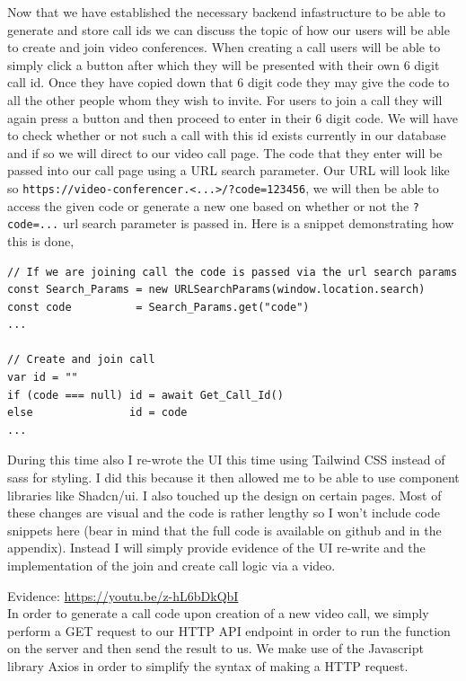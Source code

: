 Now that we have established the necessary backend
infastructure to be able to generate and store call
ids we can discuss the topic of how our users
will be able to create and join video conferences.
When creating a call users will be able to simply
click a button after which they will be presented
with their own 6 digit call id. Once they have copied
down that 6 digit code they may give the code to all
the other people whom they wish to invite. For users
to join a call they will again press a button and then
proceed to enter in their 6 digit code. We will have
to check whether or not such a call with this id
exists currently in our database and if so we will
direct to our video call page. The code that they enter
will be passed into our call page using a URL search
parameter. Our URL will look like so
\texttt{https://video-conferencer.<...>/?code=123456},
we will then be able to access the given code or generate a
new one based on whether or not the \texttt{?code=...} url
search parameter is passed in. Here is a snippet demonstrating
how this is done,

\begin{verbatim}
// If we are joining call the code is passed via the url search params
const Search_Params = new URLSearchParams(window.location.search)
const code          = Search_Params.get("code")
...

// Create and join call
var id = ""
if (code === null) id = await Get_Call_Id()
else               id = code
...
\end{verbatim}

During this time also I re-wrote the UI this time using
Tailwind CSS instead of sass for styling. I did this because
it then allowed me to be able to use component libraries like
Shadcn/ui. I also touched up the design on certain pages.
Most of these changes are visual and the code is rather lengthy
so I won't include code snippets here
(bear in mind that the full code is available
on github and in the appendix). Instead I will simply provide
evidence of the UI re-write and the implementation of the join
and create call logic via a video.\\
\vspace{0.2cm}

{\sffamily Evidence:} \url{https://youtu.be/z-hL6bDkQbI}
\\

In order to generate a call code upon creation of a new
video call, we simply perform a GET request to our HTTP API
endpoint in order to run the 
function on the server and then send the result to us. We make
use of the Javascript library Axios in order to simplify
the syntax of making a HTTP request.


